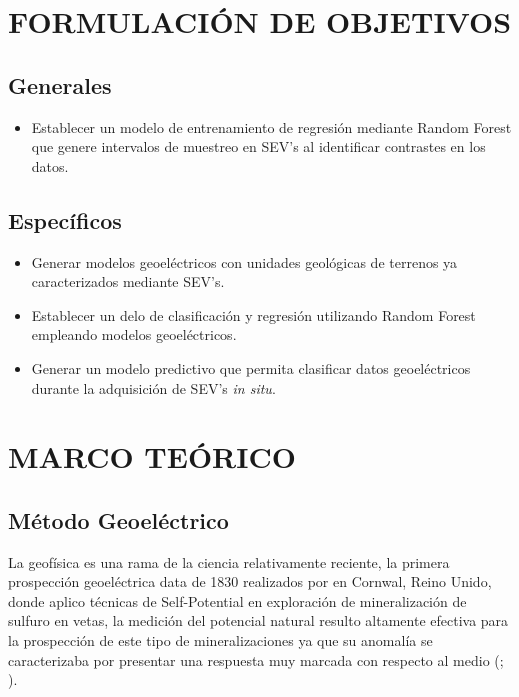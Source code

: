 \chapter{FORMULACIÓN DE OBJETIVOS}

\section{Generales}

\begin{itemize}

	\item Establecer un modelo de entrenamiento de regresión mediante Random Forest que genere intervalos de muestreo en SEV's al identificar contrastes en los datos.
\end{itemize}

\section{Específicos}


\begin{itemize}
	\item Generar modelos geoeléctricos con unidades geológicas de terrenos ya caracterizados mediante SEV's.
	\item Establecer un delo de clasificación y regresión utilizando Random Forest empleando  modelos geoeléctricos.
	\item Generar un modelo predictivo que permita clasificar datos geoeléctricos durante la adquisición de SEV's \textit{in situ}.
	
\end{itemize}


\newpage


\chapter{MARCO TEÓRICO}
	\section{Método Geoeléctrico}
		La geofísica es una rama de la ciencia relativamente reciente, la primera prospección geoeléctrica data de 1830 realizados por \cite{fox1830} en Cornwal, Reino Unido, donde aplico técnicas de Self-Potential en exploración de mineralización de sulfuro en vetas, la medición del potencial natural resulto altamente efectiva para la prospección de este tipo de mineralizaciones ya que su anomalía se caracterizaba por presentar una respuesta muy marcada con respecto al medio (\citet{revil2013}; \citep{reynolds2011, revil2013}).\\
		
